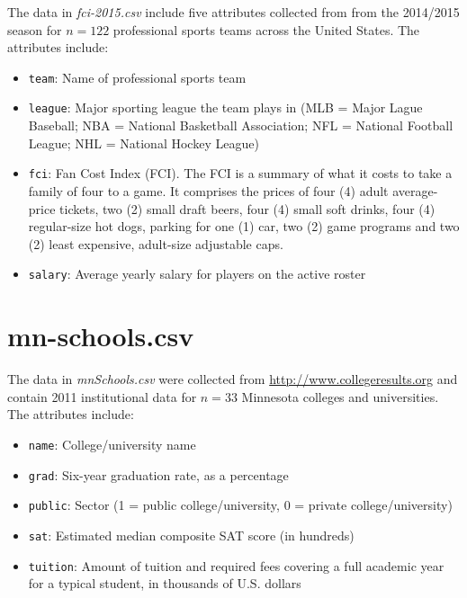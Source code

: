 \documentclass[]{book}
\providecommand{\tightlist}{%
  \setlength{\itemsep}{0pt}\setlength{\parskip}{0pt}}
\begin{document}
The data in \emph{fci-2015.csv} include five attributes collected from from the 2014/2015 season for \(n=122\) professional sports teams across the United States. The attributes include:

\begin{itemize}
\tightlist
\item
  \texttt{team}: Name of professional sports team
\item
  \texttt{league}: Major sporting league the team plays in (MLB = Major Lague Baseball; NBA = National Basketball Association; NFL = National Football League; NHL = National Hockey League)
\item
  \texttt{fci}: Fan Cost Index (FCI). The FCI is a summary of what it costs to take a family of four to a game. It comprises the prices of four (4) adult average-price tickets, two (2) small draft beers, four (4) small soft drinks, four (4) regular-size hot dogs, parking for one (1) car, two (2) game programs and two (2) least expensive, adult-size adjustable caps.
\item
  \texttt{salary}: Average yearly salary for players on the active roster
\end{itemize}

\hypertarget{mn-schools}{%
\section*{mn-schools.csv}\label{mn-schools}}

The data in \emph{mnSchools.csv} were collected from \url{http://www.collegeresults.org} and contain 2011 institutional data for \(n=33\) Minnesota colleges and universities. The attributes include:

\begin{itemize}
\tightlist
\item
  \texttt{name}: College/university name
\item
  \texttt{grad}: Six-year graduation rate, as a percentage
\item
  \texttt{public}: Sector (1 = public college/university, 0 = private college/university)
\item
  \texttt{sat}: Estimated median composite SAT score (in hundreds)
\item
  \texttt{tuition}: Amount of tuition and required fees covering a full academic year for a typical student, in thousands of U.S. dollars
\end{itemize}
\end{document}
